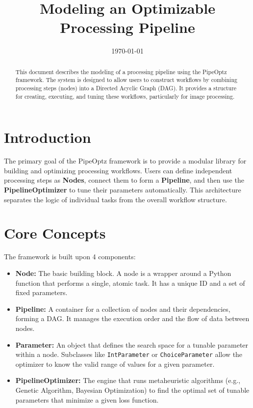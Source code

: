 \documentclass[12pt]{article}
\title{Modeling an Optimizable Processing Pipeline}
\date{\today}
\begin{document}
\maketitle

\begin{abstract}
This document describes the modeling of a processing pipeline using the PipeOptz framework. The system is designed to allow users to construct workflows by combining processing steps (nodes) into a Directed Acyclic Graph (DAG). It provides a structure for creating, executing, and tuning these workflows, particularly for image processing.
\end{abstract}

\tableofcontents
\newpage

\section{Introduction}
The primary goal of the PipeOptz framework is to provide a modular library for building and optimizing processing workflows. Users can define independent processing steps as \textbf{Nodes}, connect them to form a \textbf{Pipeline}, and then use the \textbf{PipelineOptimizer} to tune their parameters automatically. This architecture separates the logic of individual tasks from the overall workflow structure.

\section{Core Concepts}
The framework is built upon 4 components:

\begin{itemize}
    \item \textbf{Node:} The basic building block. A node is a wrapper around a Python function that performs a single, atomic task. It has a unique ID and a set of fixed parameters.
    
    \item \textbf{Pipeline:} A container for a collection of nodes and their dependencies, forming a DAG. It manages the execution order and the flow of data between nodes.
    
    \item \textbf{Parameter:} An object that defines the search space for a tunable parameter within a node. Subclasses like \texttt{IntParameter} or \texttt{ChoiceParameter} allow the optimizer to know the valid range of values for a given parameter.
    
    \item \textbf{PipelineOptimizer:} The engine that runs metaheuristic algorithms (e.g., Genetic Algorithm, Bayesian Optimization) to find the optimal set of tunable parameters that minimize a given loss function.
\end{itemize}
\end{document}
